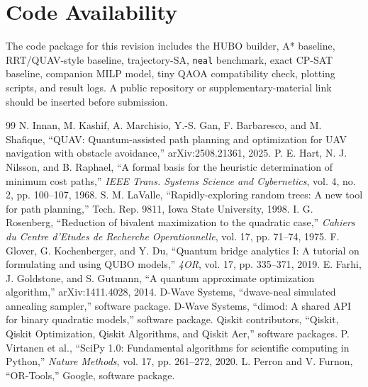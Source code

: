 \documentclass[10pt,conference]{IEEEtran}
\begin{document}
\section*{Code Availability}
The code package for this revision includes the HUBO builder, A* baseline, RRT/QUAV-style baseline, trajectory-SA, \texttt{neal} benchmark, exact CP-SAT baseline, companion MILP model, tiny QAOA compatibility check, plotting scripts, and result logs. A public repository or supplementary-material link should be inserted before submission.

\begin{thebibliography}{99}
 N. Innan, M. Kashif, A. Marchisio, Y.-S. Gan, F. Barbaresco, and M. Shafique, ``QUAV: Quantum-assisted path planning and optimization for UAV navigation with obstacle avoidance,'' arXiv:2508.21361, 2025.
 P. E. Hart, N. J. Nilsson, and B. Raphael, ``A formal basis for the heuristic determination of minimum cost paths,'' \emph{IEEE Trans. Systems Science and Cybernetics}, vol. 4, no. 2, pp. 100--107, 1968.
 S. M. LaValle, ``Rapidly-exploring random trees: A new tool for path planning,'' Tech. Rep. 9811, Iowa State University, 1998.
 I. G. Rosenberg, ``Reduction of bivalent maximization to the quadratic case,'' \emph{Cahiers du Centre d'Etudes de Recherche Operationnelle}, vol. 17, pp. 71--74, 1975.
 F. Glover, G. Kochenberger, and Y. Du, ``Quantum bridge analytics I: A tutorial on formulating and using QUBO models,'' \emph{4OR}, vol. 17, pp. 335--371, 2019.
 E. Farhi, J. Goldstone, and S. Gutmann, ``A quantum approximate optimization algorithm,'' arXiv:1411.4028, 2014.
 D-Wave Systems, ``dwave-neal simulated annealing sampler,'' software package.
 D-Wave Systems, ``dimod: A shared API for binary quadratic models,'' software package.
 Qiskit contributors, ``Qiskit, Qiskit Optimization, Qiskit Algorithms, and Qiskit Aer,'' software packages.
 P. Virtanen et al., ``SciPy 1.0: Fundamental algorithms for scientific computing in Python,'' \emph{Nature Methods}, vol. 17, pp. 261--272, 2020.
 L. Perron and V. Furnon, ``OR-Tools,'' Google, software package.
\end{thebibliography}
\end{document}

